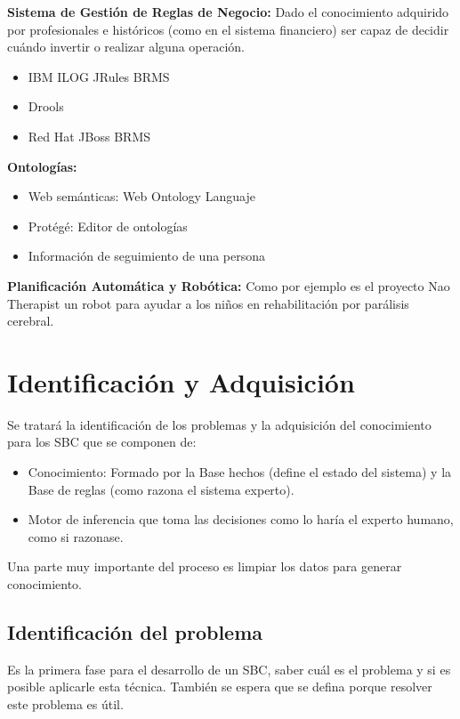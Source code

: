 \documentclass[12pt, twoside, openright]{report} %
\begin{document}
\textbf{Sistema de Gestión de Reglas de Negocio:} Dado el conocimiento adquirido por profesionales e históricos (como en el sistema financiero) ser capaz de decidir cuándo invertir o realizar alguna operación.
\begin{itemize}
	\item IBM ILOG JRules BRMS
	\item Drools
	\item Red Hat JBoss BRMS
\end{itemize}

\textbf{Ontologías:}
\begin{itemize}
	\item Web semánticas: Web Ontology Languaje
	\item Protégé: Editor de ontologías
	\item Información de seguimiento de una persona
\end{itemize}

\textbf{Planificación Automática y Robótica:} Como por ejemplo es el proyecto Nao Therapist un robot para ayudar a los niños en rehabilitación por parálisis cerebral.

\chapter{Identificación y Adquisición}
Se tratará la identificación de los problemas y la adquisición del conocimiento para los SBC que se componen de:
\begin{itemize}
	\item Conocimiento: Formado por la Base hechos (define el estado del sistema) y la Base de reglas (como razona el sistema experto).
	\item Motor de inferencia que toma las decisiones como lo haría el experto humano, como si razonase.
\end{itemize}

Una parte muy importante del proceso es limpiar los datos para generar conocimiento.

\section{Identificación del problema}
Es la primera fase para el desarrollo de un SBC, saber cuál es el problema y si es posible aplicarle esta técnica. También se espera que se defina porque resolver este problema es útil.
\end{document}
